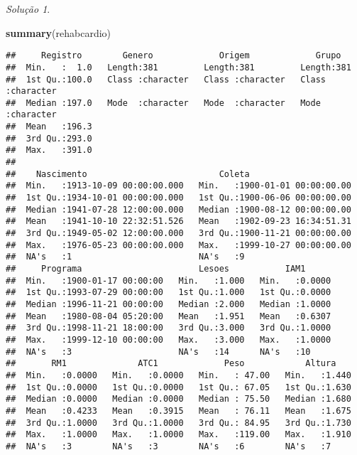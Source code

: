 \documentclass[
]{latex/krantz}
\newenvironment{Shaded}{\begin{snugshade}}{\end{snugshade}}
\newcommand{\FunctionTok}[1]{\textcolor[rgb]{0.13,0.29,0.53}{\textbf{#1}}}
\newcommand{\NormalTok}[1]{#1}
\theoremstyle{definition}
\theoremstyle{definition}
\theoremstyle{definition}
\theoremstyle{definition}
\theoremstyle{remark}
\newtheorem*{solution}{Solução}
\begin{document}
\begin{solution}
\begin{Shaded}
\begin{Highlighting}[]
\FunctionTok{summary}\NormalTok{(rehabcardio)}
\end{Highlighting}
\end{Shaded}

\begin{verbatim}
##     Registro        Genero             Origem             Grupo          
##  Min.   :  1.0   Length:381         Length:381         Length:381        
##  1st Qu.:100.0   Class :character   Class :character   Class :character  
##  Median :197.0   Mode  :character   Mode  :character   Mode  :character  
##  Mean   :196.3                                                           
##  3rd Qu.:293.0                                                           
##  Max.   :391.0                                                           
##                                                                          
##    Nascimento                          Coleta                      
##  Min.   :1913-10-09 00:00:00.000   Min.   :1900-01-01 00:00:00.00  
##  1st Qu.:1934-10-01 00:00:00.000   1st Qu.:1900-06-06 00:00:00.00  
##  Median :1941-07-28 12:00:00.000   Median :1900-08-12 00:00:00.00  
##  Mean   :1941-10-10 22:32:51.526   Mean   :1902-09-23 16:34:51.31  
##  3rd Qu.:1949-05-02 12:00:00.000   3rd Qu.:1900-11-21 00:00:00.00  
##  Max.   :1976-05-23 00:00:00.000   Max.   :1999-10-27 00:00:00.00  
##  NA's   :1                         NA's   :9                       
##     Programa                       Lesoes           IAM1       
##  Min.   :1900-01-17 00:00:00   Min.   :1.000   Min.   :0.0000  
##  1st Qu.:1993-07-29 00:00:00   1st Qu.:1.000   1st Qu.:0.0000  
##  Median :1996-11-21 00:00:00   Median :2.000   Median :1.0000  
##  Mean   :1980-08-04 05:20:00   Mean   :1.951   Mean   :0.6307  
##  3rd Qu.:1998-11-21 18:00:00   3rd Qu.:3.000   3rd Qu.:1.0000  
##  Max.   :1999-12-10 00:00:00   Max.   :3.000   Max.   :1.0000  
##  NA's   :3                     NA's   :14      NA's   :10      
##       RM1              ATC1             Peso            Altura     
##  Min.   :0.0000   Min.   :0.0000   Min.   : 47.00   Min.   :1.440  
##  1st Qu.:0.0000   1st Qu.:0.0000   1st Qu.: 67.05   1st Qu.:1.630  
##  Median :0.0000   Median :0.0000   Median : 75.50   Median :1.680  
##  Mean   :0.4233   Mean   :0.3915   Mean   : 76.11   Mean   :1.675  
##  3rd Qu.:1.0000   3rd Qu.:1.0000   3rd Qu.: 84.95   3rd Qu.:1.730  
##  Max.   :1.0000   Max.   :1.0000   Max.   :119.00   Max.   :1.910  
##  NA's   :3        NA's   :3        NA's   :6        NA's   :7      

\end{verbatim}
\end{solution}
\end{document}
